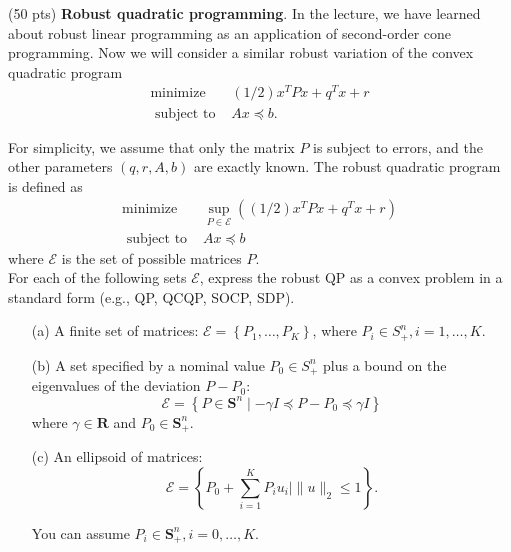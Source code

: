\item {\color{red} (50 pts)} \textbf{Robust quadratic programming}. In the lecture, we have learned about robust linear programming as an application of second-order cone programming. Now we will consider a similar robust variation of the convex quadratic program
$$
\begin{array}{ll}
\operatorname{minimize} & (1 / 2) x^T P x+q^T x+r \\
\text { subject to } & A x \preceq b .
\end{array}
$$

For simplicity, we assume that only the matrix $P$ is subject to errors, and the other parameters $(q, r, A, b)$ are exactly known. The robust quadratic program is defined as
$$
\begin{array}{cl}
\operatorname{minimize} & \sup _{P \in \mathcal{E}}\left((1 / 2) x^T P x+q^T x+r\right) \\
\text { subject to } & A x \preceq b
\end{array}
$$
where $\mathcal{E}$ is the set of possible matrices $P$.\\
For each of the following sets $\mathcal{E}$, express the robust QP as a convex problem in a standard form (e.g., QP, QCQP, SOCP, SDP).
\begin{itemize}
    \item[(a)] A finite set of matrices: $\mathcal{E}=\left\{P_1, \ldots, P_K\right\}$, where $P_i \in S_{+}^n, i=1, \ldots, K$.
    \item[(b)] A set specified by a nominal value $P_0 \in S_{+}^n$ plus a bound on the eigenvalues of the deviation $P-P_0$:
    $$
    \mathcal{E}=\left\{P \in \mathbf{S}^n \mid-\gamma I \preceq P-P_0 \preceq \gamma I\right\}
    $$
    where $\gamma \in \mathbf{R}$ and $P_0 \in \mathbf{S}_{+}^n$.

    \item[(c)] An ellipsoid of matrices:
    $$
    \mathcal{E}=\left\{P_0+\sum_{i=1}^K P_i u_i \mid\|u\|_2 \leq 1\right\} .
    $$

    You can assume $P_i \in \mathbf{S}_{+}^n, i=0, \ldots, K$.
\end{itemize}

\solution{}






\newpage